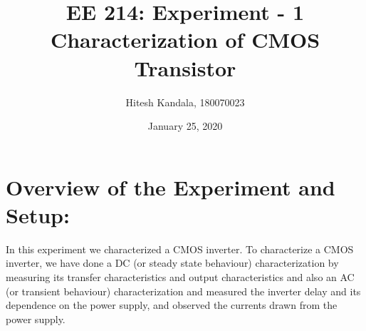 \documentclass[12pt]{article}
\title{EE 214: Experiment - 1 \\
       Characterization of CMOS Transistor}
\author{Hitesh Kandala, 180070023 }
\date{January 25, 2020}
\begin{document}
 \maketitle

  \section{Overview of the Experiment and Setup:}
  
  In this experiment we characterized a CMOS inverter. To characterize a CMOS inverter, we have done a DC (or steady state behaviour) characterization by measuring its transfer characteristics and output characteristics and also an AC (or transient behaviour) characterization and measured the inverter delay and its dependence on the power supply, and observed the currents drawn from the power supply.
  
\end{document}
